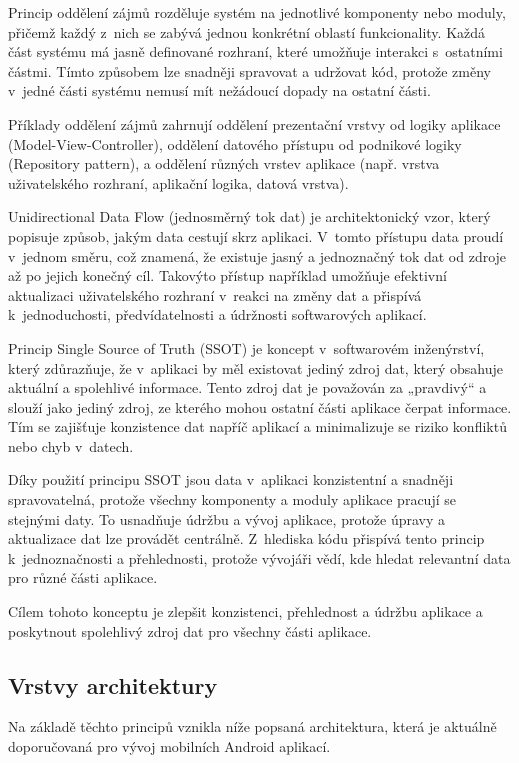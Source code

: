 Princip oddělení zájmů rozděluje systém na jednotlivé komponenty nebo moduly, přičemž každý z~nich se zabývá jednou konkrétní 
oblastí funkcionality. Každá část systému má jasně definované rozhraní, které umožňuje interakci s~ostatními částmi. 
Tímto způsobem lze snadněji spravovat a udržovat kód, protože změny v~jedné části systému nemusí mít nežádoucí dopady na ostatní části.

Příklady oddělení zájmů zahrnují oddělení prezentační vrstvy od logiky aplikace (Model-View-Controller), oddělení datového přístupu od 
podnikové logiky (Repository pattern), a oddělení různých vrstev aplikace (např. vrstva uživatelského rozhraní, aplikační logika, datová vrstva). 

Unidirectional Data Flow (jednosměrný tok dat) je architektonický vzor, který popisuje způsob, jakým data cestují skrz aplikaci. 
V~tomto přístupu data proudí v~jednom směru, což znamená, že existuje jasný a jednoznačný tok dat od zdroje až po jejich konečný cíl.
Takovýto přístup například umožňuje efektivní aktualizaci uživatelského rozhraní v~reakci na změny dat a přispívá k~jednoduchosti, 
předvídatelnosti a údržnosti softwarových aplikací.

Princip Single Source of Truth (SSOT) je koncept v~softwarovém inženýrství, který zdůrazňuje, že v~aplikaci by měl existovat jediný 
zdroj dat, který obsahuje aktuální a spolehlivé informace. Tento zdroj dat je považován za „pravdivý“ a slouží jako jediný zdroj, 
ze kterého mohou ostatní části aplikace čerpat informace. Tím se zajišťuje konzistence dat napříč aplikací a minimalizuje se riziko 
konfliktů nebo chyb v~datech.

Díky použití principu SSOT jsou data v~aplikaci konzistentní a snadněji spravovatelná, protože všechny komponenty a moduly aplikace pracují se stejnými 
daty. To usnadňuje údržbu a vývoj aplikace, protože úpravy a aktualizace dat lze provádět centrálně. Z~hlediska kódu přispívá tento
princip k~jednoznačnosti a přehlednosti, protože vývojáři vědí, kde hledat relevantní data pro různé části aplikace.

Cílem tohoto konceptu je zlepšit konzistenci, přehlednost a údržbu aplikace a poskytnout spolehlivý zdroj dat pro všechny části aplikace.


\subsection*{Vrstvy architektury} \label{vrstvyArchitekturySection} 
Na základě těchto principů vznikla níže popsaná architektura, která je aktuálně doporučovaná pro vývoj mobilních Android aplikací.

